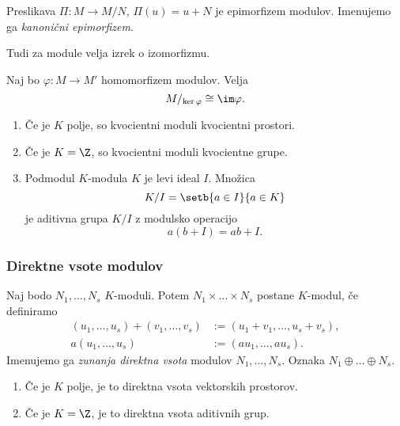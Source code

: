Preslikava $\Pi \colon M \to M/N$, $\Pi(u) = u + N$ je epimorfizem modulov. Imenujemo ga 
\emph{kanonični epimorfizem}.

Tudi za module velja izrek o izomorfizmu. 
\begin{izrek}[o izomorfizmu]
    Naj bo $\varphi \colon M \to M'$ homomorfizem modulov. Velja
    \[
        M/_{\ker\varphi} \cong \im \varphi.
    \]
\end{izrek}

\begin{primer}
    \begin{enumerate}
        \item Če je $K$ polje, so kvocientni moduli kvocientni prostori.
        \item Če je $K = \Z$, so kvocientni moduli kvocientne grupe.
        \item Podmodul $K$-modula $K$ je levi ideal $I$. Množica 
        \[
            K/I = \setb{a \in I}{a \in K}
        \]
        je aditivna grupa $K/I$ z modulsko operacijo
        \[
            a(b+I) = ab + I.
        \]
    \end{enumerate}
\end{primer}

\subsubsection*{Direktne vsote modulov}


Naj bodo $N_1, \dots, N_s$ $K$-moduli. Potem $N_1 \times \dots \times N_s$ 
postane $K$-modul, če definiramo
\begin{align*}
    (u_1, \dots, u_s) + (v_1, \dots, v_s) &:= (u_1 + v_1, \dots, u_s + v_s), \\
    a(u_1, \dots, u_s) &:= (au_1, \dots, au_s).
\end{align*}
Imenujemo ga \emph{zunanja direktna vsota} modulov 
$N_1, \dots, N_s$. Oznaka $N_1 \oplus \dots \oplus N_s$.

\begin{primer} %
    \begin{enumerate}
        \item Če je $K$ polje, je to direktna vsota vektorskih prostorov.
        \item Če je $K = \Z$, je to direktna vsota aditivnih grup. 
    \end{enumerate}
\end{primer}

